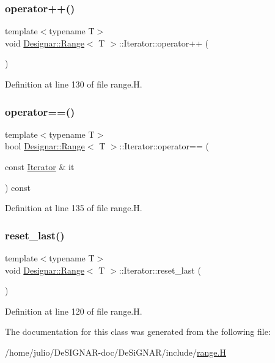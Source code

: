 \subsubsection{\texorpdfstring{operator++()}{operator++()}}
{\footnotesize\ttfamily template$<$typename T$>$ \\
void \hyperlink{class_designar_1_1_range}{Designar\+::\+Range}$<$ T $>$\+::Iterator\+::operator++ (\begin{DoxyParamCaption}{ }\end{DoxyParamCaption})\hspace{0.3cm}{\ttfamily [inline]}}



Definition at line 130 of file range.\+H.

\mbox{\label{class_designar_1_1_range_1_1_iterator_a0c3ce6ecdc451e8f8f91d114485abb2b}} 
\subsubsection{\texorpdfstring{operator==()}{operator==()}}
{\footnotesize\ttfamily template$<$typename T$>$ \\
bool \hyperlink{class_designar_1_1_range}{Designar\+::\+Range}$<$ T $>$\+::Iterator\+::operator== (\begin{DoxyParamCaption}\item[{const \hyperlink{class_designar_1_1_range_1_1_iterator}{Iterator} \&}]{it }\end{DoxyParamCaption}) const\hspace{0.3cm}{\ttfamily [inline]}}



Definition at line 135 of file range.\+H.

\mbox{\label{class_designar_1_1_range_1_1_iterator_ae5a8045527f0582b9a0f126ccf50ae19}} 
\subsubsection{\texorpdfstring{reset\+\_\+last()}{reset\_last()}}
{\footnotesize\ttfamily template$<$typename T$>$ \\
void \hyperlink{class_designar_1_1_range}{Designar\+::\+Range}$<$ T $>$\+::Iterator\+::reset\+\_\+last (\begin{DoxyParamCaption}{ }\end{DoxyParamCaption})\hspace{0.3cm}{\ttfamily [inline]}}



Definition at line 120 of file range.\+H.



The documentation for this class was generated from the following file\+:\begin{DoxyCompactItemize}
\item 
/home/julio/\+De\+S\+I\+G\+N\+A\+R-\/doc/\+De\+Si\+G\+N\+A\+R/include/\hyperlink{range_8_h}{range.\+H}\end{DoxyCompactItemize}
